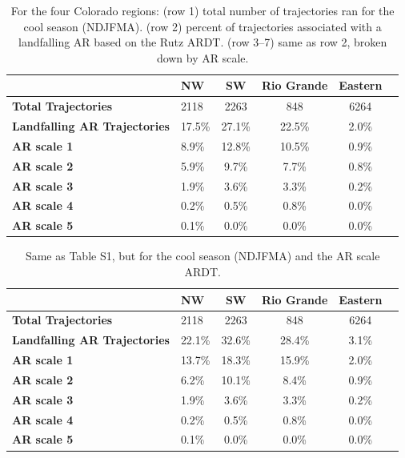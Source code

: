 \documentclass[draft,jgrga]{agutexSI2019}
\begin{document}
\begin{article}

\begin{table}
\caption{For the four Colorado regions: (row 1) total number of trajectories ran for the cool season (NDJFMA).
            (row 2) percent of trajectories associated with a landfalling AR based on the 
            Rutz ARDT. 
            (row 3--7) same as row 2, broken down by AR scale.}
\label{table:NDJFMAar}
\begin{tabular}{lp{2cm}cccc}
\toprule
 & NW & SW & Rio Grande & Eastern \\
\midrule
\textbf{Total Trajectories} & 2118 & 2263 & 848 & 6264 \\
\textbf{Landfalling AR Trajectories} & 17.5\% & 27.1\% & 22.5\% & 2.0\% \\
\textbf{AR scale 1} & 8.9\% & 12.8\% & 10.5\% & 0.9\% \\
\textbf{AR scale 2} & 5.9\% & 9.7\% & 7.7\% & 0.8\% \\
\textbf{AR scale 3} & 1.9\% & 3.6\% & 3.3\% & 0.2\% \\
\textbf{AR scale 4} & 0.2\% & 0.5\% & 0.8\% & 0.0\% \\
\textbf{AR scale 5} & 0.1\% & 0.0\% & 0.0\% & 0.0\% \\
\bottomrule
\end{tabular}
\end{table}

\begin{table}
\caption{ Same as Table S1, but for the cool season (NDJFMA) and the AR scale ARDT.}
\label{table:NDJFMAar_scale}
\begin{tabular}{lp{2cm}cccc}
\toprule
 & NW & SW & Rio Grande & Eastern \\
\midrule
\textbf{Total Trajectories} & 2118 & 2263 & 848 & 6264 \\
\textbf{Landfalling AR Trajectories} & 22.1\% & 32.6\% & 28.4\% & 3.1\% \\
\textbf{AR scale 1} & 13.7\% & 18.3\% & 15.9\% & 2.0\% \\
\textbf{AR scale 2} & 6.2\% & 10.1\% & 8.4\% & 0.9\% \\
\textbf{AR scale 3} & 1.9\% & 3.6\% & 3.3\% & 0.2\% \\
\textbf{AR scale 4} & 0.2\% & 0.5\% & 0.8\% & 0.0\% \\
\textbf{AR scale 5} & 0.1\% & 0.0\% & 0.0\% & 0.0\% \\
\bottomrule
\end{tabular}
\end{table}


\end{article}
\end{document}
